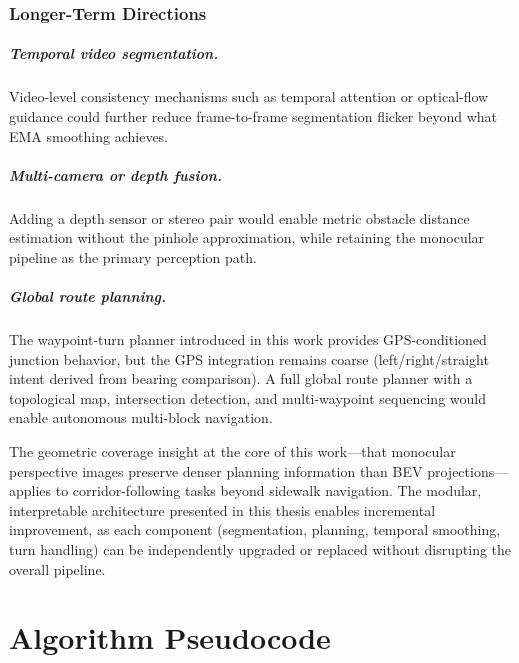 \documentclass[12pt,letterpaper,oneside]{report}
\begin{document}
\subsection{Longer-Term Directions}

\paragraph{Temporal video segmentation.}  Video-level consistency mechanisms such as temporal attention or optical-flow guidance could further reduce frame-to-frame segmentation flicker beyond what EMA smoothing achieves.

\paragraph{Multi-camera or depth fusion.}  Adding a depth sensor or stereo pair would enable metric obstacle distance estimation without the pinhole approximation, while retaining the monocular pipeline as the primary perception path.

\paragraph{Global route planning.}  The waypoint-turn planner introduced in this work provides GPS-conditioned junction behavior, but the GPS integration remains coarse (left/right/straight intent derived from bearing comparison).  A full global route planner with a topological map, intersection detection, and multi-waypoint sequencing would enable autonomous multi-block navigation.

\medskip

The geometric coverage insight at the core of this work---that monocular perspective images preserve denser planning information than BEV projections---applies to corridor-following tasks beyond sidewalk navigation.  The modular, interpretable architecture presented in this thesis enables incremental improvement, as each component (segmentation, planning, temporal smoothing, turn handling) can be independently upgraded or replaced without disrupting the overall pipeline.


\appendix

\chapter{Algorithm Pseudocode}
\label{app:algorithms}
\end{document}
